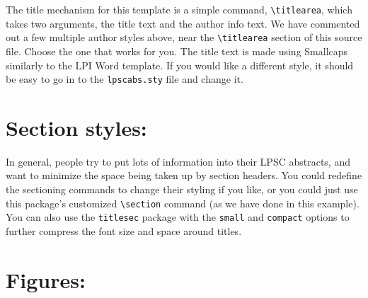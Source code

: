 \documentclass[twoside, 10pt]{article}
\begin{document}
The title mechanism for this template is a simple command,
\verb=\titlearea=, which takes two arguments, the title text and the
author info text. We have commented out a few multiple author styles above,
near the \verb=\titlearea= section of this source file. Choose the
one that works for you. The title text is made using {\sc Smallcaps} similarly to the LPI Word
template.  If you would like a different style, it should be easy to go in to 
the \texttt{lpscabs.sty} file and change it.

\section*{Section styles:}

In general, people try to put lots of information into their LPSC
abstracts, and want to minimize the space being taken up by section
headers.  You could redefine the sectioning commands to change their
styling if you like, or you could just use this package's customized 
\verb=\section= command (as we have done in this example).  
You can also use the \texttt{titlesec} package with the \texttt{small} 
and \texttt{compact} options to further compress the font size and 
space around titles.

\section*{Figures:}
\end{document}

